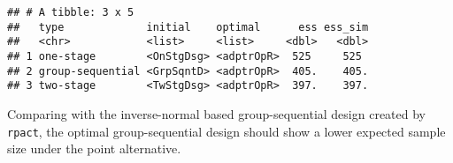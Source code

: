 \documentclass[]{book}
\newenvironment{Shaded}{\begin{snugshade}}{\end{snugshade}}
\newcommand{\CommentTok}[1]{\textcolor[rgb]{0.56,0.35,0.01}{\textit{#1}}}
\newcommand{\DataTypeTok}[1]{\textcolor[rgb]{0.13,0.29,0.53}{#1}}
\newcommand{\DecValTok}[1]{\textcolor[rgb]{0.00,0.00,0.81}{#1}}
\newcommand{\FloatTok}[1]{\textcolor[rgb]{0.00,0.00,0.81}{#1}}
\newcommand{\KeywordTok}[1]{\textcolor[rgb]{0.13,0.29,0.53}{\textbf{#1}}}
\newcommand{\NormalTok}[1]{#1}
\newcommand{\OperatorTok}[1]{\textcolor[rgb]{0.81,0.36,0.00}{\textbf{#1}}}
\newcommand{\StringTok}[1]{\textcolor[rgb]{0.31,0.60,0.02}{#1}}
\begin{document}
\begin{Shaded}
\end{Shaded}

\begin{verbatim}
## # A tibble: 3 x 5
##   type             initial    optimal      ess ess_sim
##   <chr>            <list>     <list>     <dbl>   <dbl>
## 1 one-stage        <OnStgDsg> <adptrOpR>  525     525 
## 2 group-sequential <GrpSqntD> <adptrOpR>  405.    405.
## 3 two-stage        <TwStgDsg> <adptrOpR>  397.    397.
\end{verbatim}

Comparing with the inverse-normal based group-sequential design created
by \texttt{rpact}, the optimal group-sequential design should show
a lower expected sample size under the point alternative.
\end{document}
